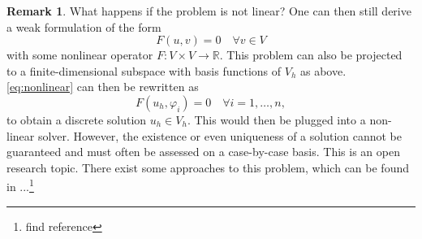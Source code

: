 \documentclass[12pt,a4paper,twoside, open=right]{scrreprt}
\theoremstyle{definition}
\newtheorem{rem}[auf]{Remark}
\theoremstyle{plain}
\newcommand{\rr}{\mathbb{R}}
\begin{document}
\begin{rem}
    What happens if the problem is not linear? One can then still derive a weak formulation of the form
    \begin{equation}
        F(u,v) = 0 \quad\forall v \in V\label{eq:nonlinear}
    \end{equation}
    with some nonlinear operator $F:V\times V\to\rr$.
    This problem can also be projected to a finite-dimensional subspace with basis functions of $V_h$ as above. \eqref{eq:nonlinear} can then be rewritten as 
    \begin{equation}
        F(u_h, \varphi_i) = 0 \quad \forall i=1,\dotsc,n,
    \end{equation}
    to obtain a discrete solution $u_h\in V_h$. This would then be plugged into a non-linear solver. However, the existence or even uniqueness of a solution cannot be guaranteed and must often be assessed on a case-by-case basis. This is an open research topic. There exist some approaches to this problem, which can be found in ...\footnote{find reference}
\end{rem}
\end{document}
